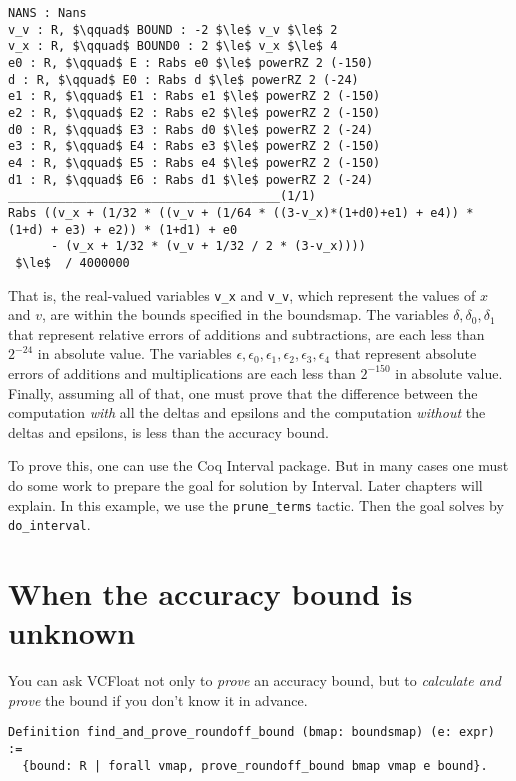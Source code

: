 \documentclass[article]{memoir}
\begin{document}
\begin{lstlisting}
NANS : Nans
v_v : R, $\qquad$ BOUND : -2 $\le$ v_v $\le$ 2
v_x : R, $\qquad$ BOUND0 : 2 $\le$ v_x $\le$ 4
e0 : R, $\qquad$ E : Rabs e0 $\le$ powerRZ 2 (-150)
d : R, $\qquad$ E0 : Rabs d $\le$ powerRZ 2 (-24)
e1 : R, $\qquad$ E1 : Rabs e1 $\le$ powerRZ 2 (-150)
e2 : R, $\qquad$ E2 : Rabs e2 $\le$ powerRZ 2 (-150)
d0 : R, $\qquad$ E3 : Rabs d0 $\le$ powerRZ 2 (-24)
e3 : R, $\qquad$ E4 : Rabs e3 $\le$ powerRZ 2 (-150)
e4 : R, $\qquad$ E5 : Rabs e4 $\le$ powerRZ 2 (-150)
d1 : R, $\qquad$ E6 : Rabs d1 $\le$ powerRZ 2 (-24)
______________________________________(1/1)
Rabs ((v_x + (1/32 * ((v_v + (1/64 * ((3-v_x)*(1+d0)+e1) + e4)) * (1+d) + e3) + e2)) * (1+d1) + e0
      - (v_x + 1/32 * (v_v + 1/32 / 2 * (3-v_x))))
 $\le$  / 4000000
\end{lstlisting}
\label{stage2proofgoal}
That is, the real-valued variables \lstinline{v_x} and \lstinline{v_v},
which represent the values of $x$ and $v$, are within the bounds
specified in the boundsmap.  The variables 
$\delta,\delta_0,\delta_1$ that represent
relative errors of additions and subtractions, are each less than
$2^{-24}$ in absolute value.  The variables 
$\epsilon,\epsilon_0,\epsilon_1,\epsilon_2,\epsilon_3,\epsilon_4$ that
represent absolute errors of additions and multiplications
are each less than $2^{-150}$ in absolute value.
Finally, assuming all of that, one must prove that the
difference between the computation \emph{with} all the
deltas and epsilons and the computation \emph{without}
the deltas and epsilons, is less than the accuracy bound.

To prove this, one can use the Coq Interval package.  But in many
cases one must do some work to prepare the goal for solution by
Interval.  Later chapters will explain.
In this example, we use the \lstinline{prune_terms} tactic.
Then the goal solves by \lstinline{do_interval}.

\chapter{When the accuracy bound is unknown}

You can ask VCFloat not only to \emph{prove} an accuracy bound,
but to \emph{calculate and prove} the bound if you don't know it
in advance.

\begin{lstlisting}
Definition find_and_prove_roundoff_bound (bmap: boundsmap) (e: expr) :=
  {bound: R | forall vmap, prove_roundoff_bound bmap vmap e bound}.
\end{lstlisting}
\end{document}
